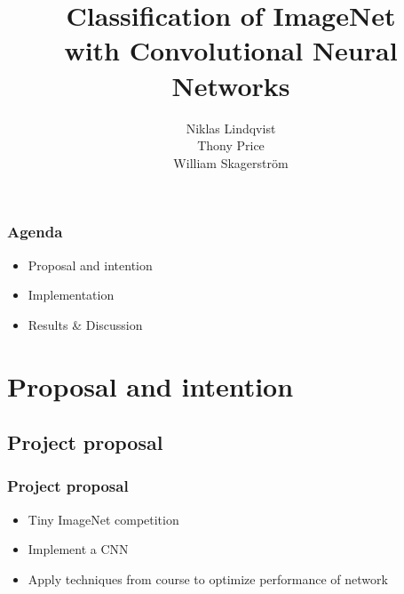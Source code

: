 \documentclass{beamer}
\title{
  Classification of ImageNet\\
  with Convolutional Neural Networks
}
\author{
  Niklas Lindqvist\\
  Thony Price\\
  William Skagerström\\
}
\begin{document}
\maketitle

\begin{frame}
  \frametitle{Agenda}
  \begin{itemize}
    \item Proposal and intention
    \item Implementation
    \item Results \& Discussion
  \end{itemize}
\end{frame}

\section{Proposal and intention}
\subsection{Project proposal}
\begin{frame}
  \frametitle{Project proposal}
  \begin{itemize}
    \item Tiny ImageNet competition
	  \item Implement a CNN
    \item Apply techniques from course to optimize performance of network
  \end{itemize}
\end{frame}
\end{document}
